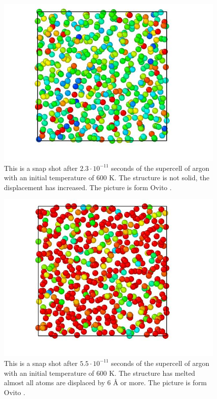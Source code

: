 \begin{multicols}{2}
\begin{figure}[H]
\includegraphics[width=\linewidth]{../figures/middle_melted_600}\caption{This is a snap shot after $2.3 \cdot 10^{-11}$ seconds of the supercell of argon with an initial temperature of 600 K. The structure is not solid, the displacement has increased. The picture is form Ovito \cite{ovito}.}\label{fig:almost_melted_600K}
\end{figure}

\begin{figure}[H]
\includegraphics[width=\linewidth]{../figures/melted_600}\caption{This is a snap shot after $5.5 \cdot 10^{-11}$ seconds of the supercell of argon with an initial temperature of 600 K. The structure has melted almost all atoms are displaced by 6 Å or more. The picture is form Ovito \cite{ovito}.}\label{fig:melted_600K}
\end{figure}

\end{multicols}

